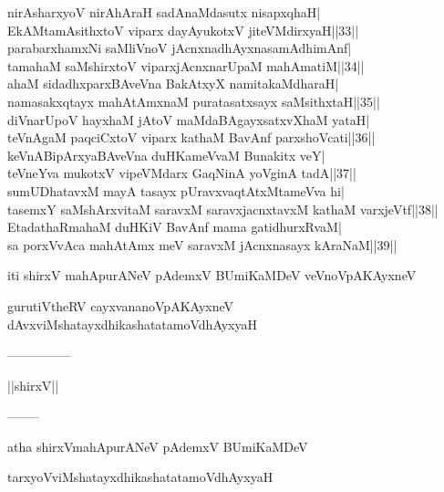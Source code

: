 \documentclass{article}
\begin{document}
nirAsharxyoV nirAhAraH sadAnaMdasutx nisapxqhaH|\\
EkAMtamAsithxtoV viparx dayAyukotxV jiteVMdirxyaH||33||\\
parabarxhamxNi saMliVnoV jAcnxnadhAyxnasamAdhimAnf|\\
tamahaM saMshirxtoV viparxjAcnxnarUpaM mahAmatiM||34||\\
ahaM sidadhxparxBAveVna BakAtxyX namitakaMdharaH|\\
namasakxqtayx mahAtAmxnaM puratasatxsayx saMsithxtaH||35||\\
diVnarUpoV hayxhaM jAtoV maMdaBAgayxsatxvXhaM yataH|\\
teVnAgaM paqciCxtoV viparx kathaM BavAnf parxshoVcati||36||\\
keVnABipArxyaBAveVna duHKameVvaM Bunakitx veY|\\
teVneYva mukotxV vipeVMdarx GaqNinA yoVginA tadA||37||\\
sumUDhatavxM mayA tasayx pUravxvaqtAtxMtameVva hi|\\
tasemxY saMshArxvitaM saravxM saravxjacnxtavxM kathaM varxjeVtf||38||\\
EtadathaRmahaM duHKiV BavAnf mama gatidhurxRvaM|\\
sa porxVvAca mahAtAmx meV saravxM jAcnxnasayx kAraNaM||39||

\begin{center}
iti shirxV mahApurANeV pAdemxV BUmiKaMDeV veVnoVpAKAyxneV
\end{center}

\begin{center}
gurutiVtheRV cayxvananoVpAKAyxneV dAvxviMshatayxdhikashatatamoVdhAyxyaH
\end{center}

\begin{center}
---------------
\end{center}

\begin{center}
||shirxV||
\end{center}

\begin{center}
--------
\end{center}

\begin{center}
atha shirxVmahApurANeV pAdemxV BUmiKaMDeV
\end{center}

\begin{center}
tarxyoVviMshatayxdhikashatatamoVdhAyxyaH
\end{center}
\end{document}
